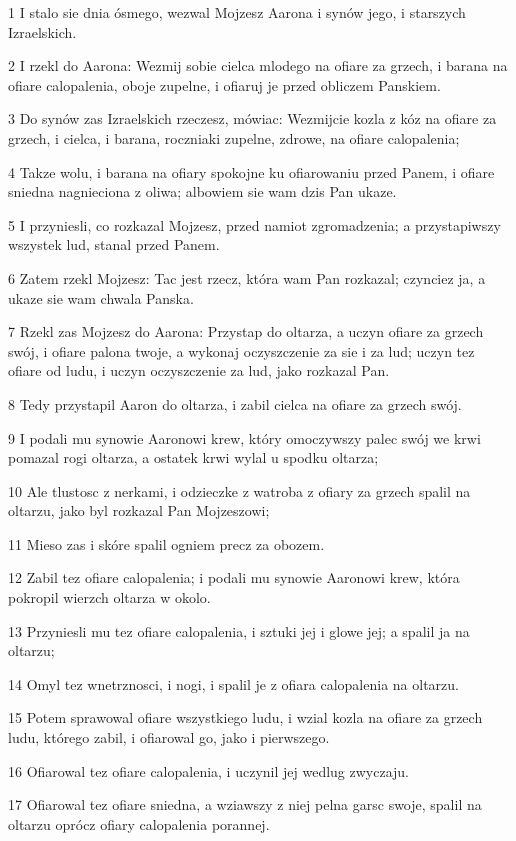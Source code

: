 \par 1 I stalo sie dnia ósmego, wezwal Mojzesz Aarona i synów jego, i starszych Izraelskich.
\par 2 I rzekl do Aarona: Wezmij sobie cielca mlodego na ofiare za grzech, i barana na ofiare calopalenia, oboje zupelne, i ofiaruj je przed obliczem Panskiem.
\par 3 Do synów zas Izraelskich rzeczesz, mówiac: Wezmijcie kozla z kóz na ofiare za grzech, i cielca, i barana, roczniaki zupelne, zdrowe, na ofiare calopalenia;
\par 4 Takze wolu, i barana na ofiary spokojne ku ofiarowaniu przed Panem, i ofiare sniedna nagnieciona z oliwa; albowiem sie wam dzis Pan ukaze.
\par 5 I przyniesli, co rozkazal Mojzesz, przed namiot zgromadzenia; a przystapiwszy wszystek lud, stanal przed Panem.
\par 6 Zatem rzekl Mojzesz: Tac jest rzecz, która wam Pan rozkazal; czynciez ja, a ukaze sie wam chwala Panska.
\par 7 Rzekl zas Mojzesz do Aarona: Przystap do oltarza, a uczyn ofiare za grzech swój, i ofiare palona twoje, a wykonaj oczyszczenie za sie i za lud; uczyn tez ofiare od ludu, i uczyn oczyszczenie za lud, jako rozkazal Pan.
\par 8 Tedy przystapil Aaron do oltarza, i zabil cielca na ofiare za grzech swój.
\par 9 I podali mu synowie Aaronowi krew, który omoczywszy palec swój we krwi pomazal rogi oltarza, a ostatek krwi wylal u spodku oltarza;
\par 10 Ale tlustosc z nerkami, i odzieczke z watroba z ofiary za grzech spalil na oltarzu, jako byl rozkazal Pan Mojzeszowi;
\par 11 Mieso zas i skóre spalil ogniem precz za obozem.
\par 12 Zabil tez ofiare calopalenia; i podali mu synowie Aaronowi krew, która pokropil wierzch oltarza w okolo.
\par 13 Przyniesli mu tez ofiare calopalenia, i sztuki jej i glowe jej; a spalil ja na oltarzu;
\par 14 Omyl tez wnetrznosci, i nogi, i spalil je z ofiara calopalenia na oltarzu.
\par 15 Potem sprawowal ofiare wszystkiego ludu, i wzial kozla na ofiare za grzech ludu, którego zabil, i ofiarowal go, jako i pierwszego.
\par 16 Ofiarowal tez ofiare calopalenia, i uczynil jej wedlug zwyczaju.
\par 17 Ofiarowal tez ofiare sniedna, a wziawszy z niej pelna garsc swoje, spalil na oltarzu oprócz ofiary calopalenia porannej.
